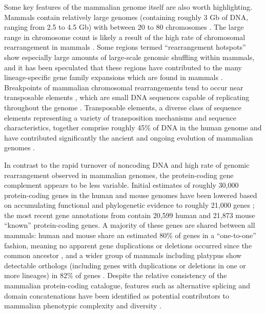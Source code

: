 Some key features of the mammalian genome itself are also worth
highlighting. Mammals contain relatively large genomes (containing
roughly 3 Gb of DNA, ranging from 2.5 to 4.5 Gb) with between 20 to 80
chromosomes \citep{Bachmann1972}. The large range in chromosome count
is likely a result of the high rate of chromosomal rearrangement in
mammals \citep{Eichler2003,Pevzner2003}. Some regions termed
``rearrangement hotspots'' show especially large amounts of
large-scale genomic shuffling within mammals, and it has been
speculated that these regions have contributed to the many
lineage-specific gene family expansions which are found in mammals
\citep{Eichler2003}. Breakpoints of mammalian chromosomal
rearrangements tend to occur near transposable elements
\citep{Zhao2009}, which are small DNA sequences capable of replicating
throughout the genome \citep{Lander2001}. Transposable elements, a
diverse class of sequence elements representing a variety of
transposition mechanisms and sequence characteristics, together
comprise roughly 45\% of DNA in the human genome and have contributed
significantly the ancient and ongoing evolution of mammalian genomes
\citep{Lander2001,Cordaux2009}.

In contrast to the rapid turnover of noncoding DNA and high rate of
genomic rearrangement observed in mammalian genomes, the
protein-coding gene complement appears to be less variable. Initial
estimates of roughly 30,000 protein-coding
\citep{Lander2001,Mouse2002Initial} genes in the human and mouse
genomes have been lowered based on accumulating functional and
phylogenetic evidence to roughly 21,000 genes \citep{Macaque2007}; the
most recent gene annotations from \ens \citep{Flicek2011} contain
20,599 human and 21,873 mouse ``known'' protein-coding genes. A
majority of these genes are shared between all mammals: human and
mouse share an estimated 80\% of genes in a ``one-to-one'' fashion,
meaning no apparent gene duplications or deletions occurred since the
common ancestor \citep{Mouse2002Initial}, and a wider group of mammals
including platypus show detectable orthologs (including genes with
duplications or deletions in one or more lineages) in 82\% of genes
\citep{Warren2008b}. Despite the relative consistency of the mammalian
protein-coding catalogue, features such as alternative splicing and
domain concatenations have been identified as potential contributors
to mammalian phenotypic complexity and diversity \citep{Lander2001}.

